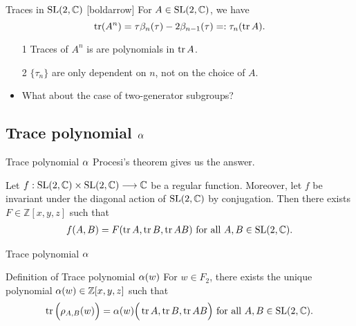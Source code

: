 \documentclass[aspectratio={169}]{beamer}
\begin{document}
\begin{frame}{Traces in $\operatorname{SL}(2,\mathbb{C})$}
[boldarrow]
For $A\in\operatorname{SL}(2,\mathbb{C})$, we have
\begin{equation*}
\operatorname{tr}(A^n) = \tau\beta_{n}(\tau) - 2\beta_{n-1}(\tau)
=: \tau_n(\operatorname{tr} A).
\end{equation*}
\begin{itemize}
\item[1] Traces of $A^n$ is are polynomials in $\operatorname{tr} A$.
\vskip 0.2cm
\item[2] $\{\tau_n\}$ are only dependent on $n$, not on the choice of $A$.
\vskip 1cm
\pause
\item What about the case of two-generator subgroups?
\end{itemize}
\end{frame}
\subsection{Trace polynomial $\operatorname{\alpha}$}
\begin{frame}{Trace polynomial $\operatorname{\alpha}$}
Procesi's theorem gives us the answer.
\begin{theorem}[Procesi]
Let $f : \operatorname{SL}(2,\mathbb{C}) \times \operatorname{SL}(2,\mathbb{C}) \longrightarrow \mathbb{C}$ be a regular function. Moreover, let $f$ be invariant under the diagonal action of $\operatorname{SL}(2,\mathbb{C})$ by conjugation. Then there exists $F \in \mathbb{Z}[x,y,z]$ such that
\begin{align*}
 f(A,B) = F(\operatorname{tr} A,\operatorname{tr} B,\operatorname{tr} AB) 
\text{ for all } A,B \in \operatorname{SL}(2,\mathbb{C}).
\end{align*}
\end{theorem}
\end{frame}
\begin{frame}{Trace polynomial $\operatorname{\alpha}$}
\pause
\begin{block}{Definition of Trace polynomial $\operatorname{\alpha}(w)$}
For $w \in F_2$, there exists the unique polynomial $\operatorname{\alpha}(w) \in \mathbb{Z}[x,y,z]$ such that
\begin{equation*}
\operatorname{tr} \Big( \rho_{A,B}(w) \Big) = \operatorname{\alpha}(w) \Big( \operatorname{tr} A, \operatorname{tr} B, \operatorname{tr} AB \Big) \text{ for all } A,B \in \operatorname{SL}(2,\mathbb{C}).
\end{equation*}
\end{block}
\end{frame}
\end{document}
